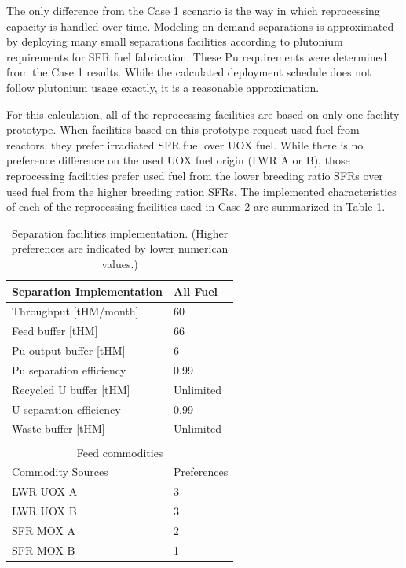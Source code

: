 \documentclass[12pt]{article}
\begin{document}
The only difference from the Case 1 scenario is the way in which reprocessing
capacity is handled over time.  Modeling on-demand separations is approximated by
deploying many small separations facilities according to plutonium requirements
for SFR fuel fabrication.  These Pu requirements were determined from the Case 1
results. While the calculated deployment schedule does not follow plutonium usage
exactly, it is a reasonable approximation.

For this calculation, all of the reprocessing facilities are based on only
one facility prototype.  When facilities based on this prototype request used fuel
from reactors, they prefer irradiated SFR fuel over UOX fuel. While there is no
preference difference on the used UOX fuel origin (LWR A or B), those
reprocessing facilities prefer used fuel from the lower breeding ratio SFRs
over used fuel from the higher breeding ration SFRs. The implemented
characteristics of each of the reprocessing facilities used in Case 2 are
summarized in Table \ref{tab:fuelfab_2}.

\begin{table}[h!]
    \centering
    \begin{tabular}{ll}
    \hline
    Separation Implementation  &  All Fuel   \\
    \hline
    Throughput [tHM/month]     &  60         \\
    Feed buffer [tHM]          &  66         \\
    Pu output buffer  [tHM]    &  6          \\
    Pu separation efficiency   &  0.99       \\
    Recycled U buffer [tHM]    &  Unlimited  \\
    U separation efficiency    &  0.99       \\
    Waste buffer [tHM]         &  Unlimited  \\ 
                                             \\
    \multicolumn{2}{c}{Feed commodities}    \\
    \hline
    Commodity Sources         &  Preferences\\
    \hline
    LWR UOX A                 &  3           \\
    LWR UOX B                 &  3           \\
    SFR MOX A                 &  2           \\
    SFR MOX B                 &  1           \\ 
    \hline
    \end{tabular}
    \caption{Separation facilities implementation. (Higher preferences are indicated by lower numerican values.)}
    \label{tab:fuelfab_2}
\end{table}
\end{document}
